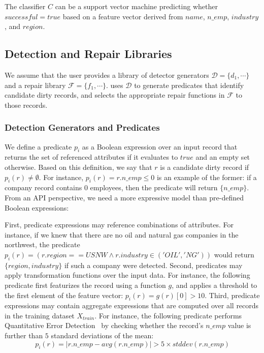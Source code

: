 \begin{example}[Classification]\sloppy
The classifier $C$ can be a support vector machine predicting whether $successful = true$ based on a feature vector derived from
$name$, $n\_emp$, $industry$, and $region$.
\end{example}

\subsection{Detection and Repair Libraries}\label{s:detectorgen}
We assume that the user provides a library of detector generators $\mathcal{D} = \{d_1,\cdots\}$ and a repair library $\mathcal{F} = \{f_1,\cdots\}$.  \sys uses $\mathcal{D}$ to generate predicates that identify candidate dirty records, and selects the appropriate repair functions in $\mathcal{F}$ to those records.  

\subsubsection{Detection Generators and Predicates}
We define a predicate $p_i$ as a Boolean expression over an input record that returns the set of referenced attributes if it evaluates to $true$ and an empty set otherwise.  Based on this definition, we say that $r$ is a candidate dirty record if $p_i(r) \ne \emptyset$. For instance, $p_i(r) = r.n\_emp \le 0$ is an example of the former: if a company record contains $0$ employees, then the predicate will return $\{n\_emp\}$.  From an API perspective, we need a more expressive model than pre-defined Boolean expressions: 

First, predicate expressions may reference combinations of attributes.  For instance, if we knew that there are no oil and natural gas companies in the northwest, the predicate $p_i(r) =  (r.region == USNW \wedge r.industry \in ('OIL','NG'))$ would return $\{region, industry\}$ if such a company were detected.
Second, predicates may apply transformation functions over the input data.  For instance, the following predicate first featurizes the record using a function $g$, and applies a threshold to the first element of the feature vector: $p_i(r) = g(r)[0] > 10$.  
Third, predicate expressions may contain aggregate expressions that are computed over all records in the training dataset $X_{train}$.  For instance, the following predicate performs Quantitative Error Detection~\cite{hellerstein2008quantitative} by checking whether the record's $n\_emp$ value is further than $5$ standard deviations of the mean: 
$$p_i(r) = |r.n\_emp - avg(r.n\_emp)| > 5\times stddev(r.n\_emp)$$

